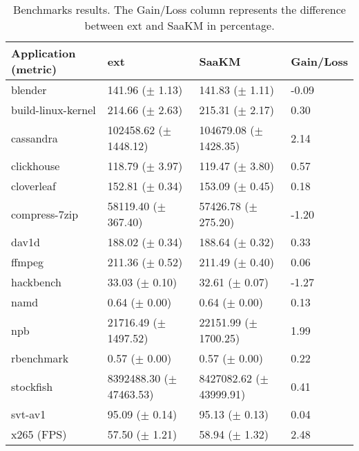 \begin{table*}[p]
        \centering
        \caption{Benchmarks results. The Gain/Loss column represents the difference between ext and SaaKM in percentage.}
        \label{tab:bench-res}
        \begin{tabular}{|l|l|l|l|}
        \hline
                Application (metric) &ext & SaaKM & Gain/Loss \\
                \hline
                blender & 141.96 ($\pm$ 1.13) & 141.83 ($\pm$ 1.11) & -0.09 \\
                build-linux-kernel & 214.66 ($\pm$ 2.63) & 215.31 ($\pm$ 2.17) & 0.30 \\
                cassandra & 102458.62 ($\pm$ 1448.12) & 104679.08 ($\pm$ 1428.35) & 2.14 \\
                clickhouse & 118.79 ($\pm$ 3.97) & 119.47 ($\pm$ 3.80) & 0.57 \\
                cloverleaf & 152.81 ($\pm$ 0.34) & 153.09 ($\pm$ 0.45) & 0.18 \\
                compress-7zip & 58119.40 ($\pm$ 367.40) & 57426.78 ($\pm$ 275.20) & -1.20 \\
                dav1d & 188.02 ($\pm$ 0.34) & 188.64 ($\pm$ 0.32) & 0.33 \\
                ffmpeg & 211.36 ($\pm$ 0.52) & 211.49 ($\pm$ 0.40) & 0.06 \\
                hackbench & 33.03 ($\pm$ 0.10) & 32.61 ($\pm$ 0.07) & -1.27 \\
                namd & 0.64 ($\pm$ 0.00) & 0.64 ($\pm$ 0.00) & 0.13 \\
                npb & 21716.49 ($\pm$ 1497.52) & 22151.99 ($\pm$ 1700.25) & 1.99 \\
                rbenchmark & 0.57 ($\pm$ 0.00) & 0.57 ($\pm$ 0.00) & 0.22 \\
                stockfish & 8392488.30 ($\pm$ 47463.53) & 8427082.62 ($\pm$ 43999.91) & 0.41 \\
                svt-av1 & 95.09 ($\pm$ 0.14) & 95.13 ($\pm$ 0.13) & 0.04 \\
                x265 (FPS) & 57.50 ($\pm$ 1.21) & 58.94 ($\pm$ 1.32) & 2.48 \\
                \hline
        
\end{tabular}
        

\end{table*}
